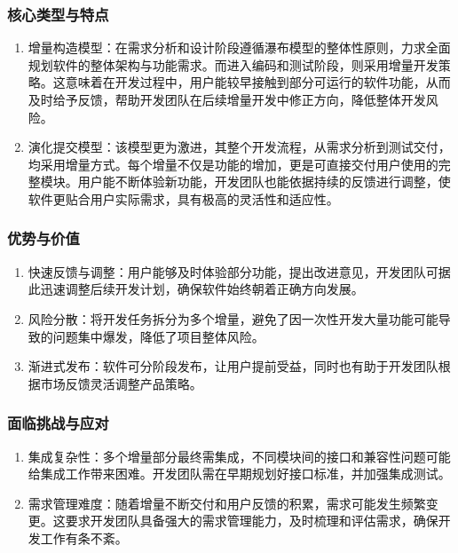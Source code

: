 \subsubsection{核心类型与特点}

\begin{enumerate}
    \item 增量构造模型：在需求分析和设计阶段遵循瀑布模型的整体性原则，力求全面规划软件的整体架构与功能需求。而进入编码和测试阶段，则采用增量开发策略。这意味着在开发过程中，用户能较早接触到部分可运行的软件功能，从而及时给予反馈，帮助开发团队在后续增量开发中修正方向，降低整体开发风险。
    \item 演化提交模型：该模型更为激进，其整个开发流程，从需求分析到测试交付，均采用增量方式。每个增量不仅是功能的增加，更是可直接交付用户使用的完整模块。用户能不断体验新功能，开发团队也能依据持续的反馈进行调整，使软件更贴合用户实际需求，具有极高的灵活性和适应性。
\end{enumerate}

\subsubsection{优势与价值}

\begin{enumerate}
    \item 快速反馈与调整：用户能够及时体验部分功能，提出改进意见，开发团队可据此迅速调整后续开发计划，确保软件始终朝着正确方向发展。
    \item 风险分散：将开发任务拆分为多个增量，避免了因一次性开发大量功能可能导致的问题集中爆发，降低了项目整体风险。
    \item 渐进式发布：软件可分阶段发布，让用户提前受益，同时也有助于开发团队根据市场反馈灵活调整产品策略。
\end{enumerate}

\subsubsection{面临挑战与应对}

\begin{enumerate}
    \item 集成复杂性：多个增量部分最终需集成，不同模块间的接口和兼容性问题可能给集成工作带来困难。开发团队需在早期规划好接口标准，并加强集成测试。
    \item 需求管理难度：随着增量不断交付和用户反馈的积累，需求可能发生频繁变更。这要求开发团队具备强大的需求管理能力，及时梳理和评估需求，确保开发工作有条不紊。
\end{enumerate}

